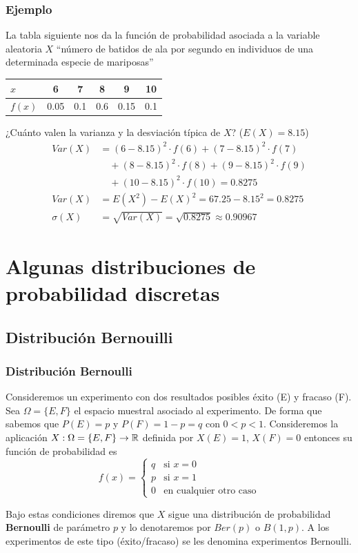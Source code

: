 \begin{frame}
\frametitle{Ejemplo}
La tabla siguiente nos da la función de probabilidad asociada a la variable aleatoria $X$ ``número de batidos de ala por segundo en individuos de una determinada especie de mariposas''
\begin{center}
\begin{tabular}{l|ccccc}
$x$ & 6 & 7 & 8 & 9 & 10\\
\hline
$f(x)$ &  0.05 & 0.1 & 0.6 & 0.15 & 0.1
\end{tabular}
\end{center}

¿Cuánto valen la varianza y la desviación típica de $X$? ($E(X)=8.15$)
{\small $$
\begin{array}{rl}
Var(X) \!\!&\!\! =(6-8.15)^2\cdot f(6)+(7-8.15)^2\cdot f(7)\\ & \quad +(8-8.15)^2\cdot f(8)+(9-8.15)^2\cdot f(9)\\ & \quad +(10-8.15)^2\cdot f(10)=0.8275\\
Var(X)  \!\!&\!\! =E(X^2)-E(X)^2=67.25-8.15^2=0.8275\\
\sigma(X)  \!\!&\!\! =\sqrt{Var(X)}=\sqrt{0.8275}\approx 0.90967
\end{array}$$
}
\end{frame}



\section{Algunas distribuciones de probabilidad discretas}
\subsection{Distribución  Bernouilli}
\begin{frame}
    \frametitle{Distribución Bernoulli}
    Consideremos un experimento con dos resultados posibles \'exito (E) y
    fracaso (F). Sea $\Omega=\{E,F\}$ el espacio muestral asociado al experimento.
    De forma que sabemos que  $P(E)=p$ y $P(F)=1-p=q$ con $0<p<1$.
    Consideremos la  aplicaci\'on $X:\Omega=\{E,F\}\to \mathbb{R}$ definida por
    $X(E)=1$, $X(F)=0$ entonces su  funci\'on de probabilidad es
    $$f(x)=\left\{\begin{array}{ll} q & \mbox{si } x=0\\
    p & \mbox{si } x=1\\
    0 & \mbox{en cualquier otro caso}\end{array}\right.$$

    Bajo estas condiciones diremos que $X$ sigue una distribuci\'on de probabilidad  \textbf{Bernoulli} de par\'ametro $p$ y lo denotaremos por  $Ber(p)$ o $B(1,p)$. A los experimentos de este tipo \newline(\'exito/fracaso) se les denomina experimentos Bernoulli.
\end{frame}
